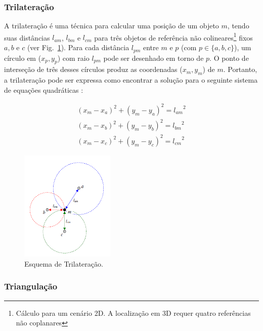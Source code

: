 \subsubsection{Trilateração}\label{sec:trilat}
A trilateração é uma técnica para calcular uma posição de um objeto $m$, tendo suas distâncias $l_{am}$, $l_{bm}$ e $l_{cm}$ para três objetos de referência não colineares\footnote{ Cálculo para um cenário 2D. A localização em 3D requer quatro referências não coplanares} fixos $a, b$ e $c$ (ver Fig.~\ref{fig:trilateracao}). Para cada distância $l_{pm}$ entre $m$ e $p$ (com $p \in \{a, b, c\}$), um círculo em ($x_{p}, y_{p}$) com raio $l_{pm}$ pode ser desenhado em torno de $p$. O ponto de interseção de três desses círculos produz as coordenadas ($x_{m}, y_{m}$) de $m$. Portanto, a trilateração pode ser expressa como encontrar a solução para o seguinte sistema de equações quadráticas \cite{linde2006aspects}:

\begin{align*}
(x_{m}-x_{a})^{2} + (y_{m}-y_{a})^{2} = {l_{am}}^{2}\\
(x_{m}-x_{b})^{2} + (y_{m}-y_{b})^{2} = {l_{bm}}^{2}\\
(x_{m}-x_{c})^{2} + (y_{m}-y_{c})^{2} = {l_{cm}}^{2}
\end{align*}



 \begin{figure}[ht]
\centering
    \includegraphics[resolution=300,width=0.4\textwidth,natwidth=610,natheight=642]{images/trilateracao.png}
    \caption{Esquema de Trilateração.}
    \label{fig:trilateracao}
\end{figure}

\subsubsection{Triangulação}\label{sec:triang}


